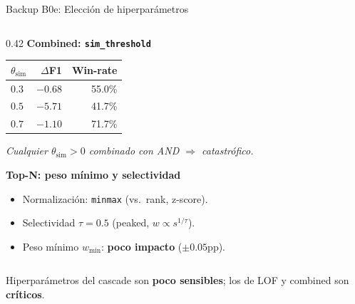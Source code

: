 \begin{frame}{Backup B0e: Elección de hiperparámetros}
\begin{columns}[T]
\begin{column}{0.42\textwidth}
\vspace{0.4em}
\textbf{Combined: \texttt{sim\_threshold}}\\[2pt]
\begin{tabular}{@{}lrr@{}}
\toprule
$\theta_{\text{sim}}$ & $\Delta$F1 & Win-rate \\
\midrule
$0.3$ & $-0.68$ & 55.0\% \\
$0.5$ & $-5.71$ & 41.7\% \\
$0.7$ & $-1.10$ & 71.7\% \\
\bottomrule
\end{tabular}
{\itshape Cualquier $\theta_{\text{sim}}{>}0$ combinado con AND $\Rightarrow$ catastrófico.}

\vspace{0.4em}
\textbf{Top-N: peso mínimo y selectividad}
\begin{itemize}\setlength\itemsep{0pt}
  \item Normalización: \texttt{minmax} (vs.\ rank, z-score).
  \item Selectividad $\tau{=}0.5$ (peaked, $w \propto s^{1/\tau}$).
  \item Peso mínimo $w_{\min}$: \textbf{poco impacto} ($\pm 0.05$pp).
\end{itemize}
\end{column}

\end{columns}

\vspace{0.3em}
\begin{insight}
\scriptsize Hiperparámetros del cascade son \textbf{poco sensibles}; los de LOF y combined son \textbf{críticos}.
\end{insight}
\end{frame}

